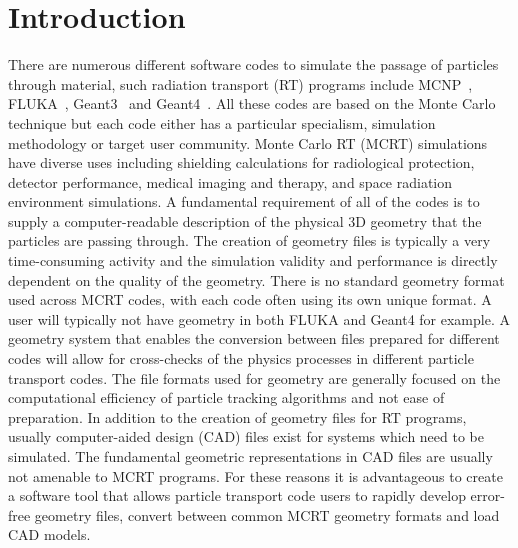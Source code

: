 \documentclass[preprint,12pt]{elsarticle}
\begin{document}
\begin{small}

\end{small}

\section{Introduction} \label{sec:introduction}
There are numerous different software codes to simulate the passage of particles through material, such radiation transport (RT) programs
include MCNP~\cite{Mcnp_Werner}, FLUKA~\cite{Fluka_Ferrari,Fluka_Bohlen}, Geant3~\cite{Geant3_Brun} and Geant4~\cite{Geant4_Agostinelli}.
All these codes are based on the Monte Carlo technique but each code either has a particular specialism, simulation methodology or target user community.
 Monte Carlo RT (MCRT) simulations have diverse uses including shielding calculations for radiological protection, detector performance, medical
imaging and therapy, and space radiation environment simulations. A fundamental requirement of all of the codes is to supply a
computer-readable description of the  physical 3D geometry that  the particles are passing through.  The creation of geometry files is
typically a very time-consuming activity and the simulation validity and performance is directly dependent on the quality of the geometry. There is no
standard geometry format used across MCRT codes, with each code often using its own unique format. A user will typically not have geometry in both FLUKA and Geant4 for example. A geometry system
that enables the conversion between files prepared for different codes will allow for cross-checks of the physics processes in different particle transport
 codes.  The file formats used for geometry are generally focused
 on the computational efficiency of particle tracking algorithms  and not ease of preparation. In addition to the creation of geometry files for RT programs, usually
 computer-aided design (CAD) files exist for systems which need to be simulated. The fundamental geometric representations in CAD files are usually not
 amenable to MCRT programs.  For these reasons it is advantageous to create a software tool that allows particle transport code users to rapidly develop
 error-free geometry files, convert between common MCRT geometry formats and load CAD models.
\end{document}
